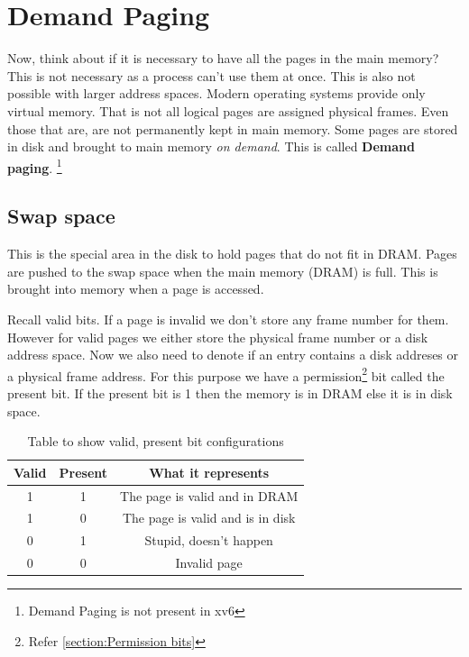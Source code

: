 \documentclass[12pt]{article}
\newcommand{\tbox}[1]{\noindent\fbox{\parbox{\textwidth}{#1}}}
\begin{document}
\noindent\tbox{
    \begin{center}
    \textbf{\Huge Lecture 16}\\
    \end{center}
}
\section{Demand Paging}
Now, think about if it is necessary to have all the pages in the main memory? This is not necessary as a process can't use them at once. This is
also not possible with larger address spaces. Modern operating systems provide only virtual memory. That is not all logical pages are assigned physical frames.
Even those that are, are not permanently kept in main memory. Some pages are stored in disk and brought to main memory \textit{on demand}. This is called 
\textbf{Demand paging}. \footnote{Demand Paging is not present in xv6}

\subsection*{Swap space}
This is the special area in the disk to hold pages that do not fit in DRAM. Pages are pushed
to the swap space when the main memory (DRAM) is full. This is brought into memory when a page is accessed.

Recall valid bits. If a page is invalid we don't store any frame number for them. However for valid pages we either store the physical frame number or 
a disk address space. Now we also need to denote if an entry contains a disk addreses or a physical frame address. For this purpose we have a permission\footnote{Refer \ref{section:Permission bits}} bit called
the present bit. If the present bit is 1 then the memory is in DRAM else it is in disk space.  

\begin{table}[h]
    \centering
    \begin{tabular}{|c|c|c|}
        \hline
        Valid & Present & What it represents\\
        \hline
        1 & 1 & The page is valid and in DRAM\\
        \hline
        1 & 0 & The page is valid and is in disk\\
        \hline
        0 & 1 & Stupid, doesn't happen\\
        \hline
        0 & 0 & Invalid page\\
        \hline
    \end{tabular}
    \caption{Table to show valid, present bit configurations}
    \label{tab:present_valid}
\end{table}
\end{document}
